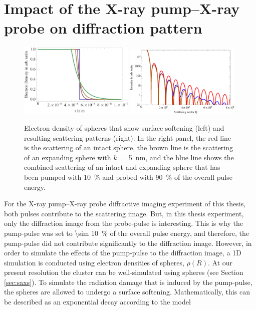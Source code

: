\section{Impact of the X-ray pump--X-ray probe on diffraction pattern}\label{sec:pump--probe-considerations}
\begin{figure}
	\centering
		\includegraphics[width=0.49\textwidth]{images/electron-density-convoluted-object.png}
		\includegraphics[width=0.49\textwidth]{images/beam-convoluted-with-object.eps}
	\caption[Influence of X-ray pump--X-ray probe pulses to a diffraction image.]{Electron density of spheres that show surface softening (left) and resulting scattering patterns (right). In the right panel, the red line is the scattering of an intact sphere, the brown line is the scattering of an expanding sphere with $k=$ \SI{5}{\nano\meter}, and the blue line shows the combined scattering of an intact and expanding sphere that has been pumped with \SI{10}{\percent} and probed with \SI{90}{\percent} of the overall pulse energy.}
	\label{fig:electron-density-convoluted-object}
\end{figure}
For the X-ray pump--X-ray probe diffractive imaging experiment of this thesis, both pulses contribute to the scattering image. But, in this thesis experiment, only the diffraction image from the probe-pulse is interesting. This is why the pump-pulse was set to \SI{\sim 10}{\percent} of the overall pulse energy, and therefore, the pump-pulse did not contribute significantly to the diffraction image. However, in order to simulate the effects of the pump-pulse to the diffraction image, a 1D simulation is conducted using electron densities of spheres, $\rho\left(R\right)$. At our present resolution the cluster can be well-simulated using spheres (see Section \ref{sec:saxs}). To simulate the radiation damage that is induced by the pump-pulse, the spheres are allowed to undergo a surface softening. Mathematically, this can be described as an exponential decay according to the model \cite{Gorkhover-2016-NatPho}
